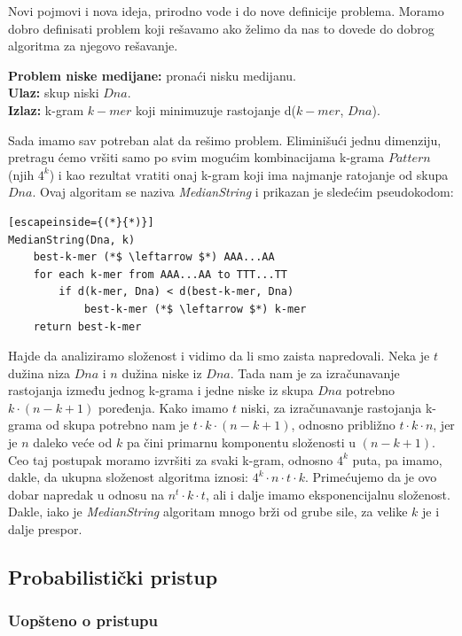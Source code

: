 Novi pojmovi i nova ideja, prirodno vode i do nove definicije problema. Moramo dobro definisati problem koji rešavamo ako želimo da nas to dovede do dobrog algoritma za njegovo rešavanje.

\begin{tcolorbox}
\textbf{Problem niske medijane:} pronaći nisku medijanu.\\
\textbf{Ulaz:} skup niski $Dna$.\\
\textbf{Izlaz:} k-gram $k-mer$ koji minimuzuje rastojanje d($k-mer$, $Dna$).
\end{tcolorbox}

Sada imamo sav potreban alat da rešimo problem. Eliminišući jednu dimenziju, pretragu ćemo vršiti samo po svim mogućim kombinacijama k-grama $Pattern$ (njih $4^k$) i kao rezultat vratiti onaj k-gram koji ima najmanje ratojanje od skupa $Dna$. Ovaj algoritam se naziva \textit{MedianString} i prikazan je sledećim pseudokodom:

\begin{lstlisting}[escapeinside={(*}{*)}]
MedianString(Dna, k)
	best-k-mer (*$ \leftarrow $*) AAA...AA
    for each k-mer from AAA...AA to TTT...TT
        if d(k-mer, Dna) < d(best-k-mer, Dna)
            best-k-mer (*$ \leftarrow $*) k-mer
    return best-k-mer
\end{lstlisting}

Hajde da analiziramo složenost i vidimo da li smo zaista napredovali. Neka je $t$ dužina niza $Dna$ i $n$ dužina niske iz $Dna$. Tada nam je za izračunavanje rastojanja između jednog k-grama i jedne niske iz skupa $Dna$ potrebno $k \cdot (n-k+1)$ poređenja. Kako imamo $t$ niski, za izračunavanje rastojanja k-grama od skupa potrebno nam je $t \cdot k \cdot (n-k+1)$, odnosno približno $t \cdot k \cdot n$, jer je $n$ daleko veće od $k$ pa čini primarnu komponentu složenosti u $(n-k+1)$. Ceo taj postupak moramo izvršiti za svaki k-gram, odnosno $4^k$ puta, pa imamo, dakle, da ukupna složenost algoritma iznosi: $4^k \cdot n \cdot t \cdot k$. Primećujemo da je ovo dobar napredak u odnosu na $n^t \cdot k \cdot t$, ali i dalje imamo eksponencijalnu složenost. Dakle, iako je \textit{MedianString} algoritam mnogo brži od grube sile, za velike $k$ je i dalje prespor. 

\subsection{Probabilistički pristup}

\subsubsection{Uopšteno o pristupu}

